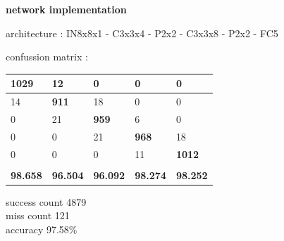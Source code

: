 \documentclass[xcolor=dvipsnames]{beamer}
\begin{document}
\begin{frame}{\bf network implementation}

architecture :
IN8x8x1 - C3x3x4 - P2x2 - C3x3x8 - P2x2 - FC5


confussion matrix :

\begin{table}[]
\begin{tabular}{|l|l|l|l|l|}
\hline
\textbf{1029}   & 12              & 0               & 0               & 0               \\ \hline
14              & \textbf{911}    & 18              & 0               & 0               \\ \hline
0               & 21              & \textbf{959}    & 6               & 0               \\ \hline
0               & 0               & 21              & \textbf{968}    & 18              \\ \hline
0               & 0               & 0               & 11              & \textbf{1012}   \\ \hline
                &                 &                 &                 &                 \\ \hline
\textbf{98.658} & \textbf{96.504} & \textbf{96.092} & \textbf{98.274} & \textbf{98.252} \\ \hline
\end{tabular}
\end{table}

success count     4879 \\
miss count         121 \\
accuracy         97.58\% \\

\end{frame}
\end{document}
